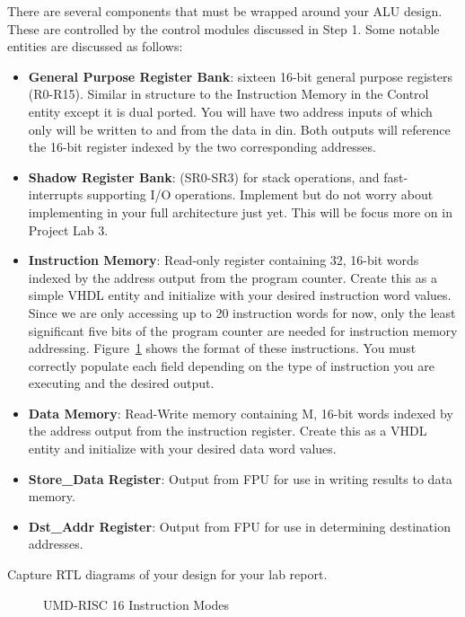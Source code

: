 \documentclass{article}
\begin{document}
\begin{enumerate}
  There are several components that must be wrapped around your ALU design. These are controlled by the control modules discussed in Step 1. Some notable entities are discussed as follows:
  
  \begin{itemize}
    \item \textbf{General Purpose Register Bank}: sixteen 16-bit general purpose registers (R0-R15). Similar in structure to the Instruction Memory in the Control entity except it is dual ported. You will have two address inputs of which only will be written to and from the data in din. Both outputs will reference the 16-bit register indexed by the two corresponding addresses.
    \item \textbf{Shadow Register Bank}: (SR0-SR3) for stack operations, and fast-interrupts supporting I/O operations. Implement but do not worry about implementing in your full architecture just yet. This will be focus more on in Project Lab 3.
    \item \textbf{Instruction Memory}: Read-only register containing 32, 16-bit words indexed by the address output from the program counter. Create this as a simple VHDL entity and initialize with your desired instruction word values. Since we are only accessing up to 20 instruction words for now, only the least significant five bits of the program counter are needed for instruction memory addressing. Figure~\ref{fig:instruction_format} shows the format of these instructions. You must correctly populate each field depending on the type of instruction you are executing and the desired output.
    \item \textbf{Data Memory}: Read-Write memory containing M, 16-bit words indexed by the address output from the instruction register. Create this as a VHDL entity and initialize with your desired data word values. 
    \item \textbf{Store\_Data Register}: Output from FPU for use in writing results to data memory.
    \item \textbf{Dst\_Addr Register}: Output from FPU for use in determining destination addresses.
  \end{itemize}
  Capture RTL diagrams of your design for your lab report.
  
  \begin{figure}[htbp]
    \centering
    \caption{UMD-RISC 16 Instruction Modes}
    \label{fig:instruction_format}
  \end{figure}
  \FloatBarrier


\end{enumerate}
\end{document}
